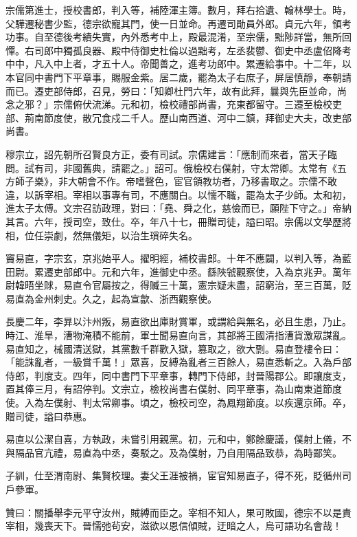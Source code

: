 \begin{pinyinscope}
 宗儒第進士，授校書郎，判入等，補陸渾主簿。數月，拜右拾遺、翰林學士。時，父驊遷秘書少監，德宗欲寵其門，使一日並命。再遷司勛員外郎。貞元六年，領考功事。自至德後考績失實，內外悉考中上，殿最混淆，至宗儒，黜陟詳當，無所回憚。右司郎中獨孤良器、殿中侍御史杜倫以過黜考，左丞裴鬱、御史中丞盧佋降考中中，凡入中上者，才五十人。帝聞善之，進考功郎中。累遷給事中。十二年，以本官同中書門下平章事，賜服金紫。居二歲，罷為太子右庶子，屏居慎靜，奉朝請而已。遷吏部侍郎，召見，勞曰：「知卿杜門六年，故有此拜，曩與先臣並命，尚念之邪？」宗儒俯伏流涕。元和初，檢校禮部尚書，充東都留守。三遷至檢校吏部、荊南節度使，散冗食戍二千人。歷山南西道、河中二鎮，拜御史大夫，改吏部尚書。



 穆宗立，詔先朝所召賢良方正，委有司試。宗儒建言：「應制而來者，當天子臨問。試有司，非國舊典，請罷之。」詔可。俄檢校右僕射，守太常卿。太常有《五方師子樂》，非大朝會不作。帝嗜聲色，宦官領教坊者，乃移書取之。宗儒不敢違，以訴宰相。宰相以事專有司，不應關白。以懦不職，罷為太子少師。太和初，進太子太傅。文宗召訪政理，對曰：「堯、舜之化，慈儉而已，願陛下守之。」帝納其言。六年，授司空，致仕。卒，年八十七，冊贈司徒，謚曰昭。宗儒以文學歷將相，位任崇劇，然無儀矩，以治生瑣碎失名。



 竇易直，字宗玄，京兆始平人。擢明經，補校書郎。十年不應闢，以判入等，為藍田尉。累遷吏部郎中。元和六年，進御史中丞。繇陜虢觀察使，入為京兆尹。萬年尉韓晤坐賕，易直令官屬按之，得贓三十萬，憲宗疑未盡，詔窮治，至三百萬，貶易直為金州刺史。久之，起為宣歙、浙西觀察使。



 長慶二年，李昪以汴州叛，易直欲出庫財賞軍，或謂給與無名，必且生患，乃止。時江、淮旱，漕物淹積不能前，軍士聞易直向言，其部將王國清指漕貨激眾謀亂。易直知之，械國清送獄，其黨數千群歡入獄，篡取之，欲大剽。易直登樓令曰：「能誅亂者，一級賞千萬！」眾喜，反縛為亂者三百餘人，易直悉斬之。入為戶部侍郎，判度支。四年，同中書門下平章事，轉門下侍郎，封晉陽郡公。即讓度支，置其俸三月，有詔停判。文宗立，檢校尚書右僕射、同平章事，為山南東道節度使。入為左僕射、判太常卿事。頃之，檢校司空，為鳳翔節度。以疾還京師。卒，贈司徒，謚曰恭惠。



 易直以公潔自喜，方執政，未嘗引用親黨。初，元和中，鄭餘慶議，僕射上儀，不與隔品官亢禮，易直為中丞，奏駁之。及為僕射，乃自用隔品致恭，為時鄙笑。



 子紃，仕至渭南尉、集賢校理。妻父王涯被禍，宦官知易直子，得不死，貶循州司戶參軍。



 贊曰：關播舉李元平守汝州，賊縛而臣之。宰相不知人，果可敗國，德宗不以是責宰相，幾喪天下。晉懦弛茍安，滋欲以恩信傾賊，迂暗之人，烏可語功名會哉！



\end{pinyinscope}